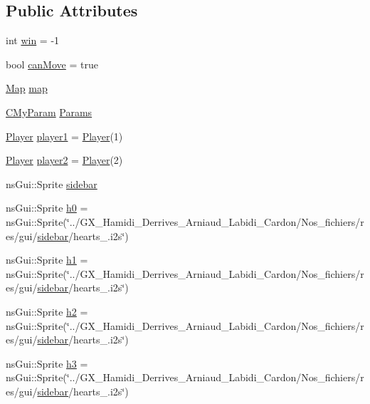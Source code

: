\subsection*{Public Attributes}
\begin{DoxyCompactItemize}
\item 
int \hyperlink{class_game_state_ab09a030e2cf36e2a693560ea49ac130d}{win} = -\/1
\item 
bool \hyperlink{class_game_state_a4b5b56c5cf57840d8a97dcee5558c8d2}{can\+Move} = true
\item 
\hyperlink{classns_game_1_1_map}{Map} \hyperlink{class_game_state_ad625592fd2f6553c7e15ba61f0232ae5}{map}
\item 
\hyperlink{struct_c_my_param}{C\+My\+Param} \hyperlink{class_game_state_a86e79cf78384b38102469e7a4ff1316e}{Params}
\item 
\hyperlink{classns_game_1_1_player}{Player} \hyperlink{class_game_state_a4de1875551db7326acb57b305dee02ac}{player1} = \hyperlink{classns_game_1_1_player}{Player}(1)
\item 
\hyperlink{classns_game_1_1_player}{Player} \hyperlink{class_game_state_a72c17b0083dee464947c0532b5bfefcd}{player2} = \hyperlink{classns_game_1_1_player}{Player}(2)
\item 
ns\+Gui\+::\+Sprite \hyperlink{class_game_state_a2e87890f9975c30f4c2bae9d6e05025f}{sidebar}
\item 
ns\+Gui\+::\+Sprite \hyperlink{class_game_state_a45d1bbc839027176c639951dc38ebed7}{h0} = ns\+Gui\+::\+Sprite(\char`\"{}../G\+X\+\_\+\+Hamidi\+\_\+\+Derrives\+\_\+\+Arniaud\+\_\+\+Labidi\+\_\+\+Cardon/Nos\+\_\+fichiers/res/gui/\hyperlink{class_game_state_a2e87890f9975c30f4c2bae9d6e05025f}{sidebar}/hearts\+\_.\+i2s\char`\"{})
\item 
ns\+Gui\+::\+Sprite \hyperlink{class_game_state_a326841cf1da976633653008aef2a04bc}{h1} = ns\+Gui\+::\+Sprite(\char`\"{}../G\+X\+\_\+\+Hamidi\+\_\+\+Derrives\+\_\+\+Arniaud\+\_\+\+Labidi\+\_\+\+Cardon/Nos\+\_\+fichiers/res/gui/\hyperlink{class_game_state_a2e87890f9975c30f4c2bae9d6e05025f}{sidebar}/hearts\+\_.\+i2s\char`\"{})
\item 
ns\+Gui\+::\+Sprite \hyperlink{class_game_state_a826f45cb8261090fa100af6ea052213b}{h2} = ns\+Gui\+::\+Sprite(\char`\"{}../G\+X\+\_\+\+Hamidi\+\_\+\+Derrives\+\_\+\+Arniaud\+\_\+\+Labidi\+\_\+\+Cardon/Nos\+\_\+fichiers/res/gui/\hyperlink{class_game_state_a2e87890f9975c30f4c2bae9d6e05025f}{sidebar}/hearts\+\_.\+i2s\char`\"{})
\item 
ns\+Gui\+::\+Sprite \hyperlink{class_game_state_ae24f40b34e42793e90828a8e862e6864}{h3} = ns\+Gui\+::\+Sprite(\char`\"{}../G\+X\+\_\+\+Hamidi\+\_\+\+Derrives\+\_\+\+Arniaud\+\_\+\+Labidi\+\_\+\+Cardon/Nos\+\_\+fichiers/res/gui/\hyperlink{class_game_state_a2e87890f9975c30f4c2bae9d6e05025f}{sidebar}/hearts\+\_.\+i2s\char`\"{})

\end{DoxyCompactItemize}

